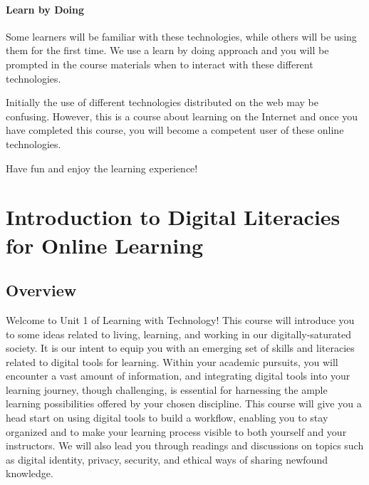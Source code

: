 \documentclass[
]{book}
\theoremstyle{definition}
\theoremstyle{definition}
\theoremstyle{definition}
\theoremstyle{definition}
\theoremstyle{remark}
\begin{document}
\hypertarget{learn-by-doing}{%
\subsubsection*{Learn by Doing}\label{learn-by-doing}}

Some learners will be familiar with these technologies, while others will be using them for the first time. We use a learn by doing approach and you will be prompted in the course materials when to interact with these different technologies.

Initially the use of different technologies distributed on the web may be confusing. However, this is a course about learning on the Internet and once you have completed this course, you will become a competent user of these online technologies.

Have fun and enjoy the learning experience!

\hypertarget{introduction-to-digital-literacies-for-online-learning}{%
\chapter{Introduction to Digital Literacies for Online Learning}\label{introduction-to-digital-literacies-for-online-learning}}

\hypertarget{overview}{%
\section*{Overview}\label{overview}}

Welcome to Unit 1 of Learning with Technology! This course will introduce you to some ideas related to living, learning, and working in our digitally-saturated society. It is our intent to equip you with an emerging set of skills and literacies related to digital tools for learning. Within your academic pursuits, you will encounter a vast amount of information, and integrating digital tools into your learning journey, though challenging, is essential for harnessing the ample learning possibilities offered by your chosen discipline. This course will give you a head start on using digital tools to build a workflow, enabling you to stay organized and to make your learning process visible to both yourself and your instructors. We will also lead you through readings and discussions on topics such as digital identity, privacy, security, and ethical ways of sharing newfound knowledge.
\end{document}
